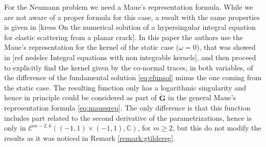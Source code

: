 \documentclass{article}
\newcommand{\todo}[1]{{\color{red}[#1]}}
\newcommand{\IC}{{\mathbb C}}
\newcommand{\cmspaceh}[4]{\mathcal{C}^{#1,#2} \left( #3, #4 \right)}
\newcommand{\iinterv}{(-1,1)\times(-1,1)}
\begin{document}
For the Neumann problem we need a Maue's representation formula. While we are not aware of a proper formula for this case, a result with the same properties is given in \todo{kress On the numerical solution of a hypersingular integral equation for elastic scattering from a planar crack}. In this paper the authors use the Maue's representation for the kernel of the static case ($\omega = 0$), that was showed in \todo{ref nedelec Integral equations with non integrable kernels}, and then proceed to explicitly find the kernel given by the co-normal traces, in both variables, of the difference of the fundamental solution \eqref{eq:efunsol}  minus the one coming from the static case. The resulting function only has a logarithmic singularity and hence in principle could be considered as part of $\widetilde{\mathbf{G}}$ in the general Maue's representation formula \eqref{eq:mauesrep}. The only difference is that this function includes part related to the second derivative of the parametrizations, hence is only in $\cmspaceh{m-2}{h}{\iinterv}{\IC}$, for $m\geq 2$, but this do not modify the results as it was noticed in Remark \ref{remark:gtildereg}. 




\appendix
\end{document}
